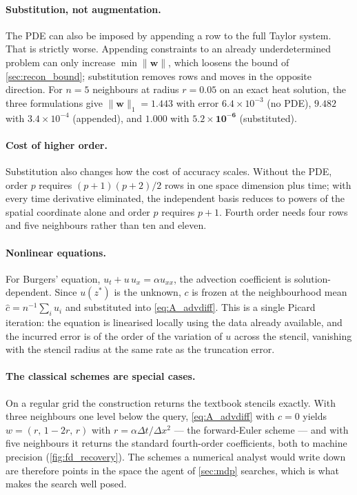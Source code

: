 \paragraph{Substitution, not augmentation.}
The PDE can also be imposed by appending a row to the full Taylor system. That
is strictly worse. Appending constraints to an already underdetermined problem
can only increase $\min\|\mathbf{w}\|$, which loosens the bound of
\cref{sec:recon_bound}; substitution removes rows and moves in the opposite
direction. For $n = 5$ neighbours at radius $r = 0.05$ on an exact heat
solution, the three formulations give
$\|\mathbf{w}\|_1 = 1.443$ with error $6.4\times10^{-3}$ (no PDE),
$9.482$ with $3.4\times10^{-4}$ (appended), and
$\mathbf{1.000}$ with $\mathbf{5.2\times10^{-6}}$ (substituted).

\paragraph{Cost of higher order.}
Substitution also changes how the cost of accuracy scales. Without the PDE,
order $p$ requires $(p+1)(p+2)/2$ rows in one space dimension plus time; with
every time derivative eliminated, the independent basis reduces to powers of
the spatial coordinate alone and order $p$ requires $p+1$. Fourth order needs
four rows and five neighbours rather than ten and eleven.

\paragraph{Nonlinear equations.}
For Burgers' equation, $u_t + u\,u_x = \alpha u_{xx}$, the advection
coefficient is solution-dependent. Since $u(z^{*})$ is the unknown, $c$ is
frozen at the neighbourhood mean $\hat{c} = n^{-1}\sum_i u_i$ and substituted
into \eqref{eq:A_advdiff}. This is a single Picard iteration: the equation is
linearised locally using the data already available, and the incurred error is
of the order of the variation of $u$ across the stencil, vanishing with the
stencil radius at the same rate as the truncation error.

\paragraph{The classical schemes are special cases.}
On a regular grid the construction returns the textbook stencils exactly. With
three neighbours one level below the query, \eqref{eq:A_advdiff} with $c = 0$
yields $w = (r,\,1-2r,\,r)$ with $r = \alpha\Delta t/\Delta x^{2}$ --- the
forward-Euler scheme --- and with five neighbours it returns the standard
fourth-order coefficients, both to machine precision
(\cref{fig:fd_recovery}). The schemes a numerical analyst would write down are
therefore points in the space the agent of \cref{sec:mdp} searches, which is
what makes the search well posed.

